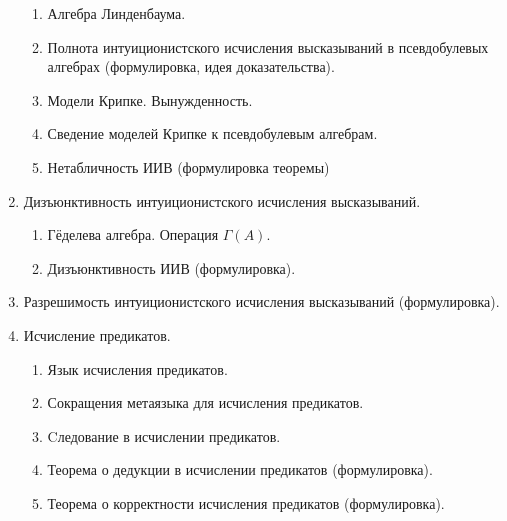 \documentclass[11pt,a4paper,oneside]{scrartcl}
\begin{document}
\begin{enumerate}
\begin{enumerate}
\item Алгебра Линденбаума. 
\item Полнота интуиционистского исчисления высказываний в псевдобулевых алгебрах (формулировка, идея доказательства).
\item Модели Крипке. Вынужденность.
\item Сведение моделей Крипке к псевдобулевым алгебрам. 
\item Нетабличность ИИВ (формулировка теоремы)
\end{enumerate}
\item Дизъюнктивность интуиционистского исчисления высказываний.
\begin{enumerate}
\item Гёделева алгебра. Операция $\Gamma(A)$.
\item Дизъюнктивность ИИВ (формулировка).
\end{enumerate}
\item Разрешимость интуиционистского исчисления высказываний (формулировка).
\item Исчисление предикатов.
\begin{enumerate}
\item Язык исчисления предикатов.
\item Сокращения метаязыка для исчисления предикатов.
\item Cледование в исчислении предикатов.
\item Теорема о дедукции в исчислении предикатов (формулировка).
\item Теорема о корректности исчисления предикатов (формулировка).
\end{enumerate}

\end{enumerate}
\end{document}
